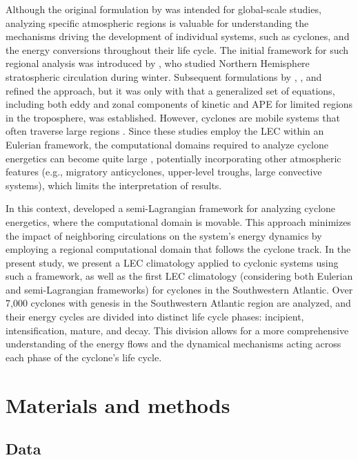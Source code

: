 \documentclass[pdflatex,sn-chicago]{sn-jnl}%
\theoremstyle{plain}
\theoremstyle{definition}
\theoremstyle{remark}
\theoremstyle{definition}
\begin{document}
Although the original formulation by \citet{lorenz1967nature} was intended for global-scale studies, analyzing specific atmospheric regions is valuable for understanding the mechanisms driving the development of individual systems, such as cyclones, and the energy conversions throughout their life cycle. The initial framework for such regional analysis was introduced by \citet{muench1965dynamics}, who studied Northern Hemisphere stratospheric circulation during winter. Subsequent formulations by \citet{dutton1967theory}, \citet{vincent1973some}, and \citet{smith1980energetics} refined the approach, but it was only with \citet{brennan1980zonal} that a generalized set of equations, including both eddy and zonal components of kinetic and APE for limited regions in the troposphere, was established. However, cyclones are mobile systems that often traverse large regions \citep[e.g.]{hoskins2002new,couto2024new}. Since these studies employ the LEC within an Eulerian framework, the computational domains required to analyze cyclone energetics can become quite large \citep[e.g.]{black2013universal}, potentially incorporating other atmospheric features (e.g., migratory anticyclones, upper-level troughs, large convective systems), which limits the interpretation of results.

In this context, \citet{michaelides1999quasi} developed a semi-Lagrangian framework for analyzing cyclone energetics, where the computational domain is movable. This approach minimizes the impact of neighboring circulations on the system's energy dynamics by employing a regional computational domain that follows the cyclone track. In the present study, we present a LEC climatology applied to cyclonic systems using such a framework, as well as the first LEC climatology (considering both Eulerian and semi-Lagrangian frameworks) for cyclones in the Southwestern Atlantic. Over 7,000 cyclones with genesis in the Southwestern Atlantic region are analyzed, and their energy cycles are divided into distinct life cycle phases: incipient, intensification, mature, and decay. This division allows for a more comprehensive understanding of the energy flows and the dynamical mechanisms acting across each phase of the cyclone's life cycle.

\section{Materials and methods}

\subsection{Data}\label{sec:data}
\end{document}
